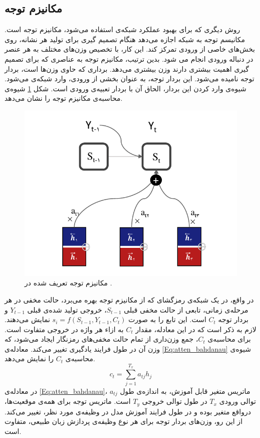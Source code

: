\subsection{مکانیزم توجه}
روش دیگری که برای بهبود عملکرد شبکه‌ی  استفاده می‌شود، مکانیزم توجه \cite{attention_bahdanau} است. مکانیسم توجه به شبکه اجازه می‌دهد هنگام تصمیم گیری برای تولید هر نشانه، روی بخش‌های خاصی از ورودی تمرکز کند. این کار، با تخصیص وزن‌های مختلف به هر عنصر در دنباله ورودی انجام می شود. بدین ترتیب، مکانیزم توجه به عناصری که برای تصمیم گیری اهمیت بیشتری دارند وزن بیشتری می‌دهد. برداری که حاوی وزن‌ها است، بردار توجه نامیده می‌شود. این بردار توجه، به عنوان بخشی از ورودی، وارد شبکه‌ی  می‌شود. شیوه‌ی وارد کردن این بردار، الحاق آن با بردار تعبیه‌ی ورودی است. شکل \ref{Fig:attenbahdanau} شیوه‌ی محاسبه‌ی مکانیزم توجه را نشان می‌دهد.
 \begin{figure}[!htb]
	\centering
	\includegraphics[scale=0.7]{Figures/bahdanauattention.pdf}
	\caption[مکانیزم توجه]{مکانیزم توجه تعریف شده در \cite{attention_bahdanau}.}
	\label{Fig:attenbahdanau}
\end{figure}


در واقع، در یک شبکه‌ی رمزگشای  که از مکانیزم توجه بهره می‌برد، حالت مخفی در هر مرحله‌ی زمانی، تابعی از حالت مخفی قبلی $S_{t-1}$، خروجی تولید شده‌ی قبلی $Y_{t-1}$ و بردار توجه $C_{t}$ است. این تابع را به صورت $s_{i}=f(S_{t-1},Y_{t-1},C_{t})$ نمایش می‌دهند. لازم به ذکر است که در این معادله، مقدار $C_{t}$ به ازاء هر واژه در خروجی متفاوت است. برای محاسبه‌ی $C_{t}$، جمع وزن‌داری از تمام حالت مخفی‌های رمزنگار ایجاد می‌شود، که وزن آن در طول فرایند یادگیری تغییر می‌کند. معادله‌ی \ref{Eq:atten_bahdanau} شیوه‌ی محاسبه‌ی $C_{t}$ را نمایش می‌دهد.
\begin{equation}
	c_{t}=\sum_{j=1}^{T_{x}}a_{tj}h_{j}
	\label{Eq:atten_bahdanau}
\end{equation}
در معادله‌ی \ref{Eq:atten_bahdanau}، $a_{tj}$ ماتریس متغیر قابل آموزش، به اندازه‌ی طول توالی ورودی $T_{x}$ در طول توالی خروجی $T_{y}$ است.
ماتریس توجه برای همه‌ی موقعیت‌ها، درواقع متغیر بوده و در طول فرایند آموزش مدل در وظیفه‌ی مورد نظر، تغییر می‌کند. از این رو، وزن‌های بردار توجه برای هر نوع وظیفه‌ی پردازش زبان طبیعی، متفاوت است.
